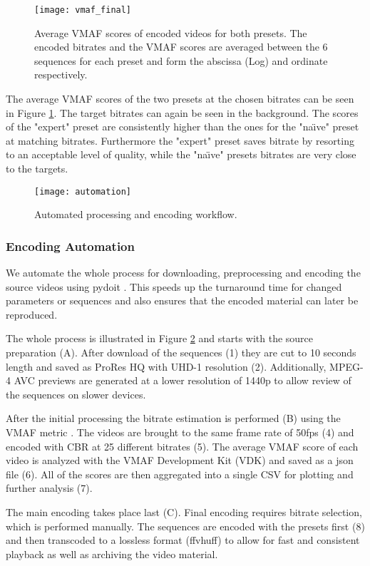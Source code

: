 \begin{figure}[bht!]
	\centering
	\texttt{[image: vmaf\_final]}
	\caption{Average VMAF scores of encoded videos for both presets. The encoded bitrates and the VMAF scores are averaged between the 6 sequences for each preset and form the abscissa (Log) and ordinate respectively.}
	\label{fig:vmaf:encoded}
\end{figure}

The average VMAF scores of the two presets at the chosen bitrates can be seen in Figure \ref{fig:vmaf:encoded}. The target bitrates can again be seen in the background. The scores of the "expert" preset are consistently higher than the ones for the "na\"{\i}ve" preset at matching bitrates. Furthermore the "expert" preset saves bitrate by resorting to an acceptable level of quality, while the "na\"{\i}ve" presets bitrates are very close to the targets.


\begin{figure}[bht!]
	\centering
	\texttt{[image: automation]}
	\caption{Automated processing and encoding workflow.}
	\label{fig:automation}
\end{figure}

\subsubsection{Encoding Automation}
We automate the whole process for downloading, preprocessing and encoding the source videos using pydoit \cite{web:pydoit}. This speeds up the turnaround time for changed parameters or sequences and also ensures that the encoded material can later be reproduced.

The whole process is illustrated in Figure \ref{fig:automation} and starts with the source preparation (A). After download of the sequences (1) they are cut to 10 seconds length and saved as ProRes HQ with UHD-1 resolution (2). Additionally, MPEG-4 AVC previews are generated at a lower resolution of 1440p to allow review of the sequences on slower devices.

After the initial processing the bitrate estimation is performed (B) using the VMAF metric \cite{lin2013:mmf}. The videos are brought to the same frame rate of 50fps (4) and encoded with CBR at 25 different bitrates (5). The average VMAF score of each video is analyzed with the VMAF Development Kit (VDK) \cite{web:vdk} and saved as a json file (6). All of the scores are then aggregated into a single CSV for plotting and further analysis (7).

The main encoding takes place last (C). Final encoding requires bitrate selection, which is performed manually. The sequences are encoded with the presets first (8) and then transcoded to a lossless format (ffvhuff) to allow for fast and consistent playback as well as archiving the video material.


